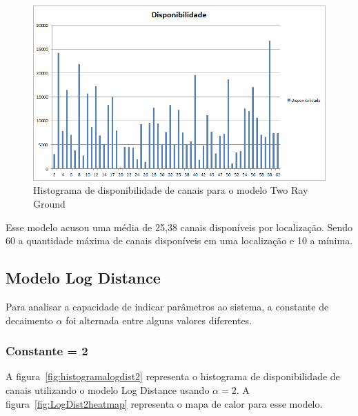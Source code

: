 \begin{figure}[htb]
\centering
\includegraphics[width=1.0\textwidth]{figs/histogramatworay}
\caption[Histograma de disponibilidade de canais para o modelo Two Ray Ground]
{Histograma de disponibilidade de canais para o modelo Two Ray Ground}
\label{fig:histogramatworay}
\end{figure} 


\FloatBarrier

Esse modelo acusou uma média de 25,38 canais disponíveis por localização. Sendo 60 a quantidade máxima de canais disponíveis em uma localização e 10 a mínima.

\subsection{Modelo Log Distance}

Para analisar a capacidade de indicar parâmetros ao sistema, a constante de decaimento \begin{math}\alpha \end{math} foi alternada entre alguns valores diferentes.

\subsubsection{Constante = 2}

A figura~\ref{fig:histogramalogdist2} representa o histograma de disponibilidade de canais utilizando o modelo Log Distance usando \begin{math}\alpha=2 \end{math}. A figura~\ref{fig:LogDist2heatmap} representa o mapa de calor para esse modelo.


